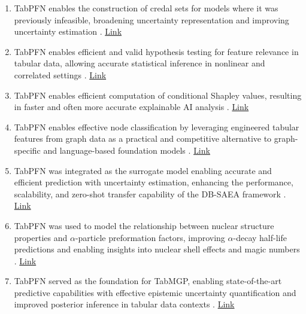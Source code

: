 \begin{enumerate}

\item TabPFN enables the construction of credal sets for models where it was previously infeasible, broadening uncertainty representation and improving uncertainty estimation \cite{hofman2026efficientcredalpredictiondecalibration}. \href{http://arxiv.org/abs/2603.08495v1}{Link}

\item TabPFN enables efficient and valid hypothesis testing for feature relevance in tabular data, allowing accurate statistical inference in nonlinear and correlated settings \cite{salem2026validfeaturelevelinferencetabular}. \href{http://arxiv.org/abs/2603.06609v1}{Link}

\item TabPFN enables efficient computation of conditional Shapley values, resulting in faster and often more accurate explainable AI analysis \cite{olsen2026computingconditionalshapleyvalues}. \href{http://arxiv.org/abs/2602.09489v1}{Link}

\item TabPFN enables effective node classification by leveraging engineered tabular features from graph data as a practical and competitive alternative to graph-specific and language-based foundation models \cite{choi2025tabpfncompetegnnsnode}. \href{http://arxiv.org/abs/2512.08798v1}{Link}

\item TabPFN was integrated as the surrogate model enabling accurate and efficient prediction with uncertainty estimation, enhancing the performance, scalability, and zero-shot transfer capability of the DB-SAEA framework \cite{du2025metablackboxoptimizationbispacelandscape}. \href{http://arxiv.org/abs/2511.15551v1}{Link}

\item TabPFN was used to model the relationship between nuclear structure properties and $\alpha$-particle preformation factors, improving $\alpha$-decay half-life predictions and enabling insights into nuclear shell effects and magic numbers \cite{qi2026systematicstudyalphaparticlepreformation}. \href{http://arxiv.org/abs/2511.14705v1}{Link}

\item TabPFN served as the foundation for TabMGP, enabling state-of-the-art predictive capabilities with effective epistemic uncertainty quantification and improved posterior inference in tabular data contexts \cite{ng2026tabmgpmartingaleposteriortabpfn}. \href{http://arxiv.org/abs/2510.25154v2}{Link}


\end{enumerate}
